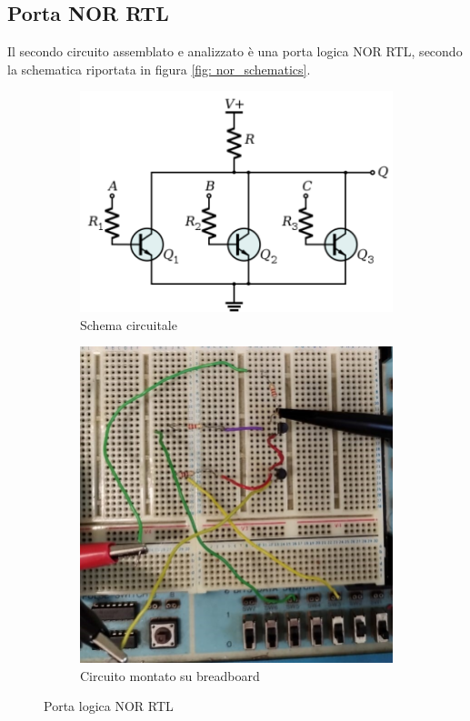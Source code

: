 \documentclass[a4paper,12pt]{article}
\begin{document}
\subsection{Porta NOR RTL}

Il secondo circuito assemblato e analizzato è una porta logica NOR RTL, secondo la schematica riportata in figura \ref{fig: nor_schematics}.

\begin{figure}[H] \label{fig: nor_schematics}
  \centering
  \begin{subfigure}{0.45\textwidth}
    \includegraphics[width=\linewidth]{schema_NOR.png}
    \caption{Schema circuitale}
  \end{subfigure}
  \hfill
  \begin{subfigure}{0.45\textwidth}
    \includegraphics[width=\linewidth]{NOR2.jpg}
    \caption{Circuito montato su breadboard}
  \end{subfigure}
  \caption{Porta logica NOR RTL}
\end{figure}
\end{document}
